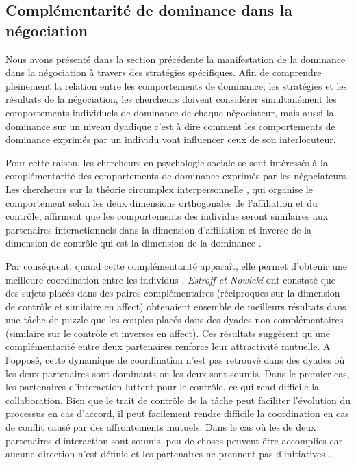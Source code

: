 	\subsection{Complémentarité de dominance dans la négociation}
	\label{sec:compEtat}
	Nous avons présenté dans la section précédente la manifestation de la dominance dans la négociation à travers des stratégies spécifiques. Afin de comprendre pleinement la relation entre les comportements de dominance, les stratégies et les résultats de la négociation, les chercheurs doivent considérer simultanément les comportements individuels de dominance de chaque négociateur, mais aussi la dominance sur un niveau dyadique c'est à dire comment les comportements de dominance exprimés par un individu vont influencer ceux de son interlocuteur. 
	
	Pour cette raison, les chercheurs en psychologie sociale se sont intéressés à la complémentarité des comportements de dominance exprimés par les négociateurs. 
	Les chercheurs sur la théorie circumplex interpersonnelle \cite{wiggins1979psychological, kiesler19831982}, qui organise le comportement selon les deux dimensions orthogonales de l'affiliation et du contrôle, affirment que les comportements des individus seront similaires aux partenaires interactionnels dans la dimension d'affiliation et inverse de la dimension de contrôle qui est la dimension de la dominance \cite{tiedens2003power}.
	
	Par conséquent, quand cette complémentarité apparaît, elle permet d'obtenir une meilleure coordination entre les individus \cite{wiltermuth2015benefits}. \emph{Estroff et Nowicki} \cite{estroff1992interpersonal} ont constaté que des sujets placés dans des paires complémentaires (réciproques sur la dimension de contrôle et similaire en affect) obtenaient ensemble de meilleurs résultats dans une tâche de puzzle que les couples placés dans des dyades non-complémentaires (similaire sur le contrôle et inverses en affect). Ces résultats suggèrent qu'une complémentarité entre deux partenaires renforce leur attractivité mutuelle.
	A l'opposé, cette dynamique de coordination n'est pas retrouvé dans des dyades où les deux partenaires sont dominants ou les deux sont soumis. 
	Dans le premier cas, les partenaires d'interaction luttent pour le contrôle, ce qui rend difficile la collaboration. Bien que le trait de contrôle de la tâche peut faciliter l'évolution du processus en cas d'accord, il peut facilement rendre difficile la coordination en cas de conflit causé par des affrontements mutuels. Dans le cas où les de deux partenaires d'interaction sont soumis, peu de choses peuvent être accomplies car aucune direction n'est définie et les partenaires ne prennent pas d'initiatives \cite{wiltermuth2015benefits}.
	 
